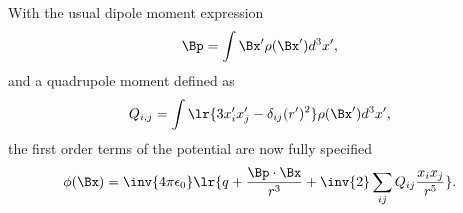 %
%
With the usual dipole moment expression
%
\begin{equation}\label{eqn:emtLecture8:580}
\Bp = \int \Bx' \rho(\Bx') d^3 x',
\end{equation}
%
and a quadrupole moment defined as
\begin{equation}\label{eqn:emtLecture8:600}
Q_{i,j} = \int \lr{ 3 x_i' x_j' - \delta_{ij} (r')^2 } \rho(\Bx') d^3 x',
\end{equation}
%
the first order terms of the potential are now fully specified
\begin{equation}\label{eqn:emtLecture8:620}
\phi(\Bx)
=
\inv{4 \pi \epsilon_0}
\lr{
q + \frac{\Bp \cdot \Bx}{r^3} +
\inv{2} \sum_{ij} Q_{ij} \frac{x_i x_j}{r^5}
}.
\end{equation}

